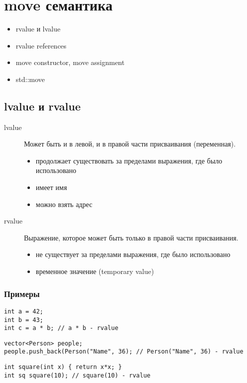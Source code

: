 \section{move семантика}
\begin{itemize}[noitemsep]
	\item rvalue и lvalue
	\item rvalue references
	\item move constructor, move assignment
	\item std::move
\end{itemize}
\subsection{lvalue и rvalue}
\begin{description}
	\item[lvalue]
		Может быть и в левой, и в правой части присваивания (переменная).
		\begin{itemize}[noitemsep]
			\item продолжает существовать за пределами выражения, где было использовано
			\item имеет имя
			\item можно взять адрес
		\end{itemize}
	\item[rvalue]
		Выражение, которое может быть только в правой части присваивания.
		\begin{itemize}[noitemsep]
			\item не существует за пределами выражения, где было использовано
			\item временное значение (temporary value)
	    \end{itemize}
\end{description}
\subsubsection{Примеры}
\begin{verbatim}
int a = 42;
int b = 43;
int c = a * b; // a * b - rvalue
\end{verbatim}
\begin{verbatim}
vector<Person> people;
people.push_back(Person("Name", 36); // Person("Name", 36) - rvalue
\end{verbatim}
\begin{verbatim}
int square(int x) { return x*x; }
int sq square(10); // square(10) - rvalue
\end{verbatim}
